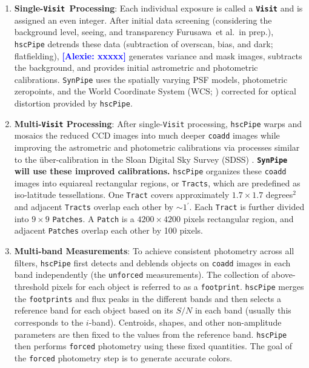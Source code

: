 \documentclass[useamsfonts]{pasj01}
\def\amin{$^\prime$}
\def\etal{{\ et al.~}}
\newcommand{\alexie}[1]{\textcolor{blue}{\textbf{[Alexie: #1]}}}
\def\hscpipe{\texttt{hscPipe}}
\def\synpipe{\texttt{SynPipe}}
\def\forced{\texttt{forced}}
\def\coadd{\texttt{coadd}}
\def\unforced{\texttt{unforced}}
\def\tract{\texttt{Tract}}
\def\visit{\texttt{Visit}}
\def\tracts{\texttt{Tracts}}
\newcommand{\term}[1]{\textbf{\texttt{#1}}}
\begin{document}
    \begin{enumerate}

        \item \textbf{Single-\texttt{Visit~}Processing}:
            Each individual exposure is called a \term{Visit} and is assigned
            an even integer.
            After initial data screening (considering the background level, seeing, and transparency
            Furusawa\etal in prep.), \hscpipe{} detrends these data (subtraction
            of overscan, bias, and dark; flatfielding), \alexie{xxxxx} generates variance and mask
            images, subtracts the background, and provides initial astrometric and
            photometric calibrations. \synpipe{} uses the spatially varying PSF models, photometric zeropoints, and the World Coordinate System (WCS; \citealt{WCS1, WCS2})
            corrected for optical distortion provided by \hscpipe{}.
        \item \textbf{Multi-\visit{} Processing}:
            After single-\visit{} processing, \hscpipe{} warps and mosaics the
            reduced CCD images into much deeper \coadd{} images while improving
            the astrometric and photometric calibrations via processes similar to
            the \"{u}ber-calibration in the Sloan Digital Sky Survey (SDSS)
            \citep{Padmanabhan2008}.
            \textbf{\synpipe{} will use these improved calibrations.}
            \hscpipe{} organizes these \coadd{} images into equiareal rectangular
            regions, or \tracts{}, which are predefined as iso-latitude tessellations.
            One \tract{} covers approximately $1.7\times 1.7$ degrees$^2$ and
            adjacent \tracts{} overlap each other by ${\sim}1$\amin{}.
            Each \tract{} is further divided into $9\times9$ \texttt{Patches}.
            A \texttt{Patch} is a $4200\times4200$ pixels rectangular region, and
            adjacent \texttt{Patches} overlap each other by 100 pixels.   
        \item \textbf{Multi-band Measurements}:
            To achieve consistent photometry across all filters, \hscpipe{} first
            detects and deblends objects on \coadd{} images in each band
            independently (the \unforced{} measurements).
            The collection of above-threshold pixels for each object is referred to as
            a \texttt{footprint}.
            \hscpipe{} merges the \texttt{footprints} and flux peaks in the different
            bands and then selects a reference band for each object based on its $S/N$ in each band (usually this corresponds to the $i$-band).  Centroids, shapes, and other non-amplitude parameters are then fixed to  the values from the reference band. \hscpipe{} then performs \forced{} photometry using these fixed quantities. The goal of the  \forced{} photometry step is to generate accurate colors.

\end{enumerate}
\end{document}
